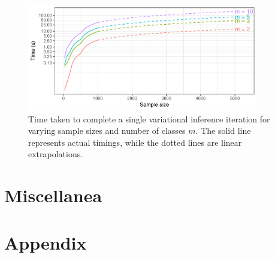 \documentclass[a4paper,showframe,11pt]{report}
\begin{document}
\begin{figure}[hbt]
  \centering
  \includegraphics[width=0.9\textwidth]{figure/05-iprobit_runtime}
  \caption[Time taken to complete a single variational inference iteration]{Time taken to complete a single variational inference iteration for varying sample sizes and number of classes $m$. The solid line represents actual timings, while the dotted lines are linear extrapolations.}
\end{figure}


\section{Miscellanea}


\ifstandalone
  \section*{Appendix}
  
  
  
  
\fi

\hClosingStuffStandalone
\end{document}
